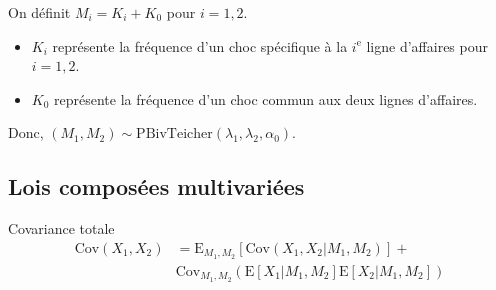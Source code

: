 \documentclass[10pt, french]{article}
\begin{document}
\begin{multicols*}{2}
\begin{definitionNOHFILL}
On définit $M_{i}	=	K_{i} + K_{0}$ pour $i	=	1, 2$.
\begin{itemize}
	\item	$K_{i}$ représente la fréquence d'un \og choc \fg{} spécifique à la $i^{\text{e}}$ ligne d'affaires pour $i = 1, 2$.
	\item	$K_{0}$ représente la fréquence d'un \og choc \fg{} commun aux deux lignes d'affaires.
\end{itemize}

Donc, $(M_{1}, M_{2})	\sim \text{PBivTeicher}(\lambda_{1}, \lambda_{2}, \alpha_{0})$.
\end{definitionNOHFILL}



\columnbreak
\subsection{Lois composées multivariées}
%
%

\begin{rappel}{Covariance totale}
\setlength{\mathindent}{-1cm}
\begin{align*}
    \text{Cov}(X_{1}, X_{2})
    &=  \text{E}_{M_{1}, M_{2}}\left[\text{Cov}(X_{1}, X_{2} | M_{1}, M_{2})\right] + \\ &\text{Cov}_{M_{1}, M_{2}}\left( \text{E}\left[X_{1}| M_{1}, M_{2}\right]\text{E}\left[X_{2}| M_{1}, M_{2}\right]\right)
\end{align*}
\setlength{\mathindent}{1cm}
\end{rappel}



\end{multicols*}
\end{document}
